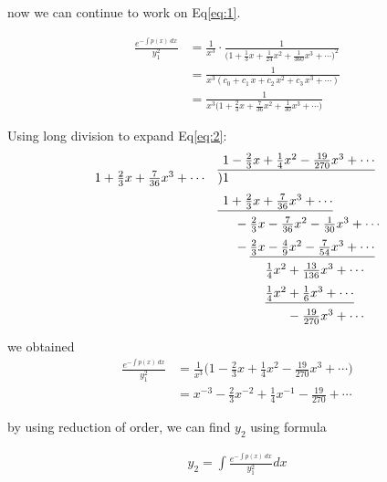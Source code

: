 \begin{solution}
    now we can continue to work on Eq\eqref{eq:1}.

    \begin{align*}
        \frac{e^{-\int p(x) \> dx}}{y_1^2} 
        &= \frac{1}{x^3} \cdot \frac{1}{\biggl(1 + \frac{1}{3}x + \frac{1}{24}x^2 + \frac{1}{360}x^3 + \cdots\biggr)^2}\\
        &= \frac{1}{x^3(c_0 + c_1\,x + c_2\,x^2 + c_3\,x^3 + \cdots)}\\
        &= \frac{1}{x^3 \biggl(1 + \frac{2}{3}x + \frac{7}{36}x^2 + \frac{1}{30}x^3 + \cdots\biggr)} \label{eq:2} \tag{b}
    \end{align*}

    Using long division to expand Eq\eqref{eq:2}:
    $$
    \begin{array}{rl}
        &\underline{\phantom{)} 1 - \frac{2}{3}x + \frac{1}{4}x^2 - \frac{19}{270}x^3 + \cdots}\\
        1+\frac{2}{3}x + \frac{7}{36}x^3 + \cdots & \smash{)}1 \\[0.6em]
        &\underline{\phantom{)} 1+\frac{2}{3}x + \frac{7}{36}x^3 + \cdots}\\[0.6em]
        &\phantom{1+}-\frac{2}{3}x - \frac{7}{36}x^2 - \frac{1}{30}x^3 + \cdots\\[0.6em]
        &\phantom{1+}-\underline{\frac{2}{3}x - \frac{4}{9}x^2 - \frac{7}{54}x^3 + \cdots}\\[0.6em]
        &\phantom{1+-\frac{2}{3}x}\frac{1}{4}x^2 + \frac{13}{136}x^3 + \cdots\\[0.6em]
        &\phantom{1+-\frac{2}{3}x}\underline{\frac{1}{4}x^2 + \frac{1}{6}x^3 + \cdots}\\[0.6em]
        &\phantom{1+-\frac{2}{3}x \frac{1}{4}x^2}-\frac{19}{270}x^3 + \cdots
    \end{array}$$

    we obtained 
    \begin{align*}
        \frac{e^{-\int p(x) \> dx}}{y_1^2}
        &= \frac{1}{x^3} \biggl(1 - \frac{2}{3}x + \frac{1}{4}x^2 - \frac{19}{270}x^3 + \cdots\biggr)\\
        &= x^{-3} - \frac{2}{3}x^{-2} + \frac{1}{4}x^{-1} - \frac{19}{270} + \cdots
    \end{align*}

    by using reduction of order, we can find $y_2$ using formula

    \begin{align*}
        y_2 = \int \frac{e^{-\int p(x) \> dx}}{y_1^2} dx
    \end{align*}
\end{solution}

